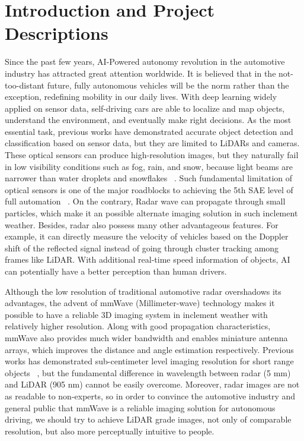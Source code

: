 \section{Introduction and Project Descriptions} \label{introduction}
Since the past few years, AI-Powered autonomy revolution in the automotive industry has attracted great attention worldwide. It is believed that in the not-too-distant future, fully autonomous vehicles will be the norm rather than the exception, redefining mobility in our daily lives. With deep learning widely applied on sensor data, self-driving cars are able to localize and map objects, understand the environment, and eventually make right decisions. As the most essential task, previous works have demonstrated accurate object detection and classification based on sensor data, but they are limited to LiDARs and cameras. These optical sensors can produce high-resolution images, but they naturally fail in low visibility conditions such as fog, rain, and snow, because light beams are narrower than water droplets and snowflakes ~\cite{snow}. Such fundamental limitation of optical sensors is one of the major roadblocks to achieving the 5th SAE level of full automation ~\cite{SAE}. On the contrary, Radar wave can propagate through small particles, which make it an possible alternate imaging solution in such inclement weather. Besides, radar also possess many other advantageous features. For example, it can directly measure the velocity of vehicles based on the Doppler shift of the reflected signal instead of going through cluster tracking among frames like LiDAR. With additional real-time speed information of objects, AI can potentially have a better perception than human drivers.

Although the low resolution of traditional automotive radar overshadows its advantages, the advent of mmWave (Millimeter-wave)  technology makes it possible to have a reliable 3D imaging system in inclement weather with relatively higher resolution. Along with good propagation characteristics, mmWave also provides much wider bandwidth and enables miniature antenna arrays, which improves the distance and angle estimation respectively. Previous works has demonstrated sub-centimeter level imaging resolution for short range objects ~\cite{mmWave_SAR}, but the fundamental difference in wavelength between radar (5 mm) and LiDAR (905 nm) cannot be easily overcome. Moreover, radar images are not as readable to non-experts, so in order to convince the automotive industry and general public that mmWave is a reliable imaging solution for autonomous driving, we should try to achieve LiDAR grade images, not only of comparable resolution, but also more perceptually intuitive to people. 

